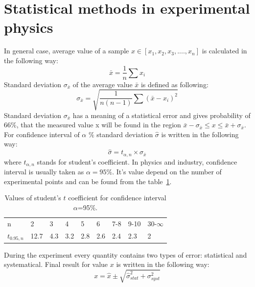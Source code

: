 \documentclass[12pt,a4paper]{report}
\begin{document}
\section{Statistical methods in experimental physics} \label{methods}

In general case, average value of a sample $x \in [x_1, x_2, x_3, .... , x_n]$ is calculated in the following way:
\begin{equation} \label{av_value}
\bar{x} = \frac{1}{n} \sum{x_i}
\end{equation}
Standard deviation $\sigma_{\bar{x}}$ of the average value $\bar{x}$ is defined as following:
\begin{equation} \label{standart_dev}
\sigma_{\bar{x}} = \sqrt{\frac{1}{n(n-1)} \sum{(\bar{x}-x_i)^2}} 
\end{equation}
Standard deviation $\sigma_{\bar{x}}$ has a meaning of a statistical error and gives probability of 66$\%$, that the measured value x will be found in the region $\bar{x} - \sigma_{\bar{x}} \le x \le \bar{x} + \sigma_{\bar{x}}$. For confidence interval of $\alpha$ $\%$ standard deviation $\hat{\sigma}$ is written in the following way:
\begin{equation} \label{standart_dev_big}
\hat{\sigma} = t_{\alpha,n}\times \sigma_{\bar{x}}
\end{equation}
where $t_{\alpha,n}$ stands for student's coefficient. In physics and industry, confidence interval is usually taken as $\alpha = 95 \%$. It's value depend on the number of experimental points and can be found from the table~\ref{table:student_t_value}.
\begin{table}[!h]
\begin{center}
\caption{\label{table:student_t_value} Values of student's $t$ coefficient for confidence interval $\alpha$=95$\%$.}
\begin{tabular}{l l l l l l l l l}
\hline
n & 2 & 3 & 4 & 5 & 6 & 7-8 & 9-10 & 30-$\infty$  \\
$t_{0.95, n}$ &12.7 & 4.3 & 3.2 & 2.8 & 2.6 & 2.4 & 2.3 & 2 \\
\hline
\end{tabular}
\end{center}
\end{table}

During the experiment every quantity contains two types of error: statistical and systematical. Final result for value $x$ is written in the following way:
\begin{equation} \label{final_value}
x = \hat{x} \pm \sqrt{\hat{\sigma}_{stat}^2+\sigma^2_{syst}}
\end{equation}
 
\end{document}

